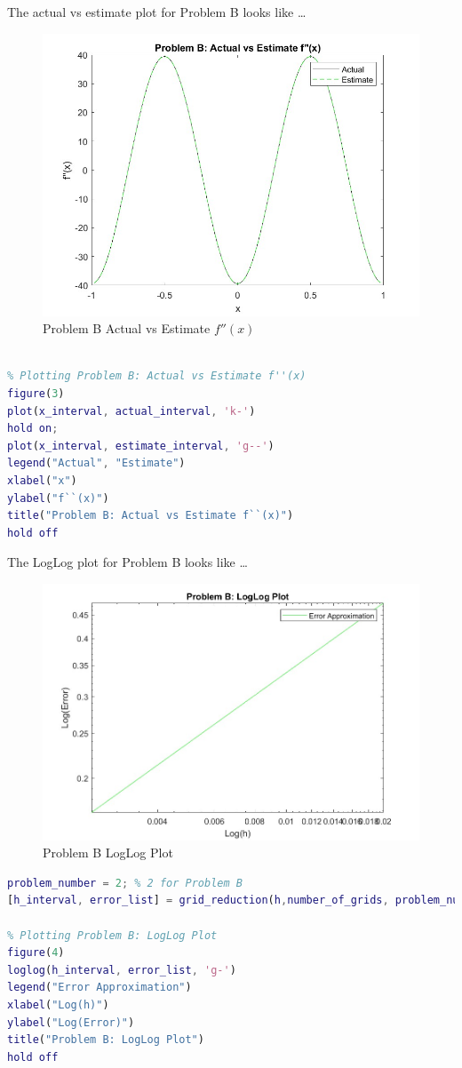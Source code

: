 \documentclass[10pt,letterpaper]{article}
\begin{document}
\begin{enumerate}[a)]
\pagebreak
    The actual vs estimate plot for Problem B looks like \ldots
    \begin{figure}[h!]
      \centering
      \includegraphics[width=0.75\linewidth]{problem_b_estimate_vs_actual.jpg}
      \caption{Problem B\: Actual vs Estimate $f''(x)$}\label{fig:problem_b_estimate_vs_actual}
    \end{figure}
     \begin{lstlisting}[language = Matlab]

% Plotting Problem B: Actual vs Estimate f''(x)
figure(3)
plot(x_interval, actual_interval, 'k-')
hold on;
plot(x_interval, estimate_interval, 'g--')
legend("Actual", "Estimate")
xlabel("x")
ylabel("f``(x)")
title("Problem B: Actual vs Estimate f``(x)")
hold off
\end{lstlisting}

\pagebreak
The LogLog plot for Problem B looks like \ldots

\begin{figure}[h!]
  \centering
  \includegraphics[width=0.75\linewidth]{problem_b_loglog_plot.jpg}
  \caption{Problem B\: LogLog Plot}\label{fig:problem_b_loglog_plot}
\end{figure}


 \begin{lstlisting}[language = Matlab]
problem_number = 2; % 2 for Problem B
[h_interval, error_list] = grid_reduction(h,number_of_grids, problem_number);

% Plotting Problem B: LogLog Plot
figure(4)
loglog(h_interval, error_list, 'g-')
legend("Error Approximation")
xlabel("Log(h)")
ylabel("Log(Error)")
title("Problem B: LogLog Plot")
hold off
\end{lstlisting}

\end{enumerate}
\end{document}
